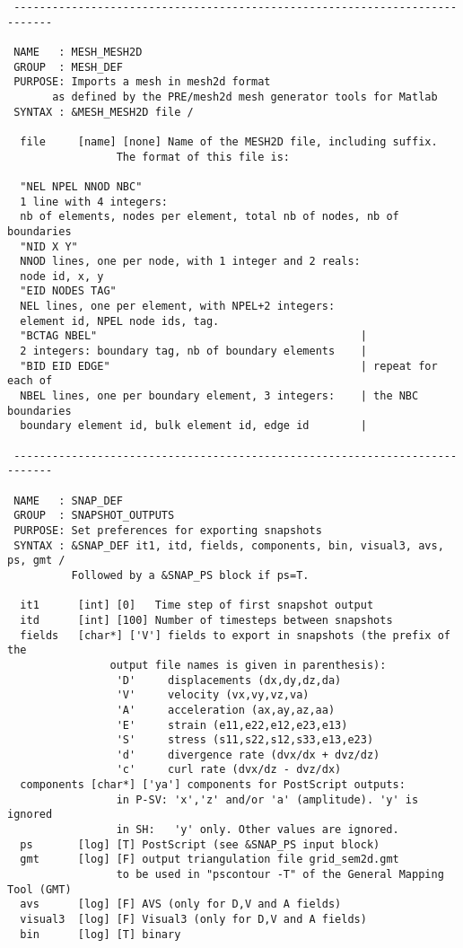 \begin{verbatim}
 ----------------------------------------------------------------------------

 NAME   : MESH_MESH2D
 GROUP  : MESH_DEF
 PURPOSE: Imports a mesh in mesh2d format 
	   as defined by the PRE/mesh2d mesh generator tools for Matlab
 SYNTAX : &MESH_MESH2D file /

  file     [name] [none] Name of the MESH2D file, including suffix.
                 The format of this file is:

  "NEL NPEL NNOD NBC"
  1 line with 4 integers: 
  nb of elements, nodes per element, total nb of nodes, nb of boundaries
  "NID X Y"
  NNOD lines, one per node, with 1 integer and 2 reals: 
  node id, x, y
  "EID NODES TAG"
  NEL lines, one per element, with NPEL+2 integers: 
  element id, NPEL node ids, tag. 
  "BCTAG NBEL"                                         |
  2 integers: boundary tag, nb of boundary elements    |
  "BID EID EDGE"                                       | repeat for each of
  NBEL lines, one per boundary element, 3 integers:    | the NBC boundaries
  boundary element id, bulk element id, edge id        |

 ----------------------------------------------------------------------------

 NAME   : SNAP_DEF
 GROUP  : SNAPSHOT_OUTPUTS
 PURPOSE: Set preferences for exporting snapshots
 SYNTAX : &SNAP_DEF it1, itd, fields, components, bin, visual3, avs, ps, gmt /
          Followed by a &SNAP_PS block if ps=T.

  it1      [int] [0]   Time step of first snapshot output
  itd      [int] [100] Number of timesteps between snapshots
  fields   [char*] ['V'] fields to export in snapshots (the prefix of the 
                output file names is given in parenthesis):
                 'D'     displacements (dx,dy,dz,da)
                 'V'     velocity (vx,vy,vz,va)
                 'A'     acceleration (ax,ay,az,aa)
                 'E'     strain (e11,e22,e12,e23,e13)
                 'S'     stress (s11,s22,s12,s33,e13,e23)
                 'd'     divergence rate (dvx/dx + dvz/dz)
                 'c'     curl rate (dvx/dz - dvz/dx)
  components [char*] ['ya'] components for PostScript outputs:
                 in P-SV: 'x','z' and/or 'a' (amplitude). 'y' is ignored 
                 in SH:   'y' only. Other values are ignored. 
  ps       [log] [T] PostScript (see &SNAP_PS input block)
  gmt      [log] [F] output triangulation file grid_sem2d.gmt
                 to be used in "pscontour -T" of the General Mapping Tool (GMT)
  avs      [log] [F] AVS (only for D,V and A fields)
  visual3  [log] [F] Visual3 (only for D,V and A fields)
  bin      [log] [T] binary
               

\end{verbatim}
